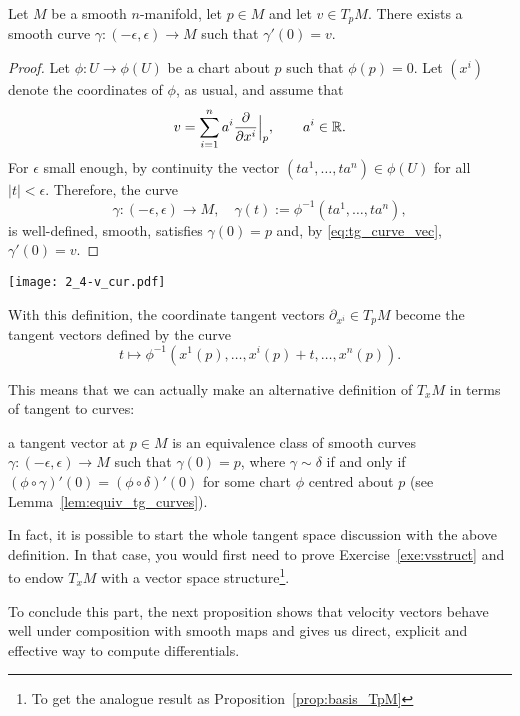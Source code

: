 \begin{theorem}
  Let $M$ be a smooth $n$-manifold, let $p\in M$ and let $v\in T_pM$.
  There exists a smooth curve $\gamma: (-\epsilon,\epsilon) \to M$ such that $\gamma'(0) = v$.
\end{theorem}
\begin{proof}
  Let $\phi:U\to\phi(U)$ be a chart about $p$ such that $\phi(p)=0$.
  Let $(x^i)$ denote the coordinates of $\phi$, as usual, and assume that
  \begin{equation}
    v = \sum_{i=1}^n a^i \frac{\partial}{\partial x^i}\Big|_p, \qquad a^i \in\mathbb{R}.
  \end{equation}
  For $\epsilon$ small enough, by continuity the vector $(ta^1, \ldots, ta^n) \in \phi(U)$ for all $|t|<\epsilon$. Therefore, the curve
  \begin{equation}
    \gamma: (-\epsilon, \epsilon) \to M, \quad \gamma(t):=\phi^{-1}(ta^1, \ldots, ta^n),
  \end{equation}
  is well-defined, smooth, satisfies $\gamma(0) = p$ and, by \eqref{eq:tg_curve_vec}, $\gamma'(0) = v$.
\end{proof}

\begin{marginfigure}
  \texttt{[image: 2\_4-v\_cur.pdf]}
  \caption{With this definition, the coordinate tangent vectors $\partial_{x^i}\in T_p M$ become the tangent vectors defined by the curve \[t \mapsto \phi^{-1}(x^1(p), \ldots, {x^i(p) + t}, \ldots, x^n(p)).\]}
  \label{fig:2_4-v_cur}
\end{marginfigure}
This means that we can actually make an alternative definition of $T_xM$ in terms of tangent to curves:
\begin{definition}\label{def:tg:ascurvespeed}
  a tangent vector at $p\in M$ is an equivalence class of smooth curves $\gamma:(-\epsilon, \epsilon)\to M$ such that $\gamma(0)=p$, where $\gamma\sim\delta$ if and only if $(\phi\circ \gamma)'(0) = (\phi\circ\delta)'(0)$ for some chart $\phi$ centred about $p$ (see Lemma~\ref{lem:equiv_tg_curves}).
\end{definition}

In fact, it is possible to start the whole tangent space discussion with the above definition. In that case, you would first need to prove Exercise~\ref{exe:vsstruct} and to endow $T_xM$ with a vector space structure\footnote{To get the analogue result as Proposition~\ref{prop:basis_TpM}}.

To conclude this part, the next proposition shows that velocity vectors behave well under composition with smooth maps and gives us direct, explicit and effective way to compute differentials.

